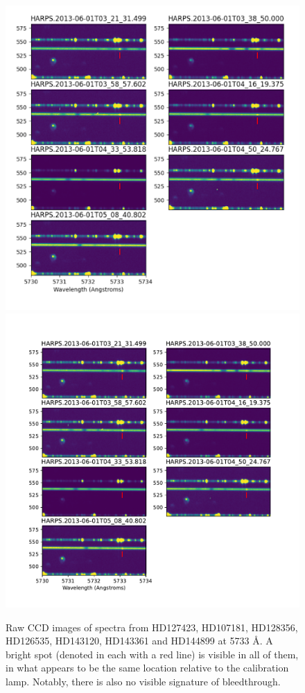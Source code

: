 \documentclass[linenumbers]{aastex631}
\begin{document}
\begin{figure}
    \centering
    \includegraphics[width=\textwidth]{rawccdmultiplestars2.png}
    \includegraphics[width=\textwidth]{rawccdmultiplestars2.pdf}    \caption{Raw CCD images of spectra from HD127423, HD107181, HD128356, HD126535, HD143120, HD143361 and HD144899 at 5733 \AA. A bright spot (denoted in each with a red line) is visible in all of them, in what appears to be the same location relative to the calibration lamp. Notably, there is also no visible signature of bleedthrough.}
    \label{fig:rawccdrecurrences}
\end{figure}
\end{document}
